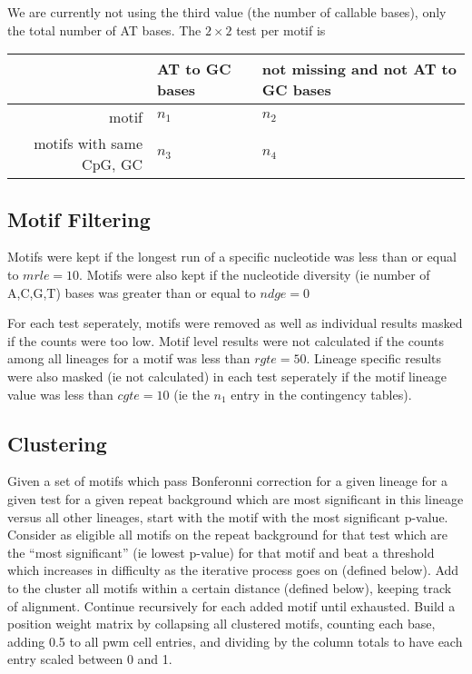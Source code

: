\documentclass{article}\usepackage[]{graphicx}\usepackage[]{color}
\begin{document}
We are currently not using the third value (the number of callable bases), only the total number of AT bases. The $2\times2$ test per motif is
                  
\begin{tabular}{r | l l }
& AT to GC bases & not missing and not AT to GC bases \\\hline
motif & $n_1$ & $n_2$ \\
motifs with same CpG, GC & $n_3$ & $n_4$ \\
\end{tabular}

\subsection*{Motif Filtering}

Motifs were kept if the longest run of a specific nucleotide was less than or equal to $mrle =10$. Motifs were also kept if the nucleotide diversity (ie number of A,C,G,T) bases was greater than or equal to $ndge =0$

For each test seperately, motifs were removed as well as individual results masked if the counts were too low. Motif level results were not calculated if the counts among all lineages for a motif was less than $ rgte = 50$. Lineage specific results were also masked (ie not calculated) in each test seperately if the motif lineage value was less than $cgte = 10$ (ie the $n_1$ entry in the contingency tables).

\subsection*{Clustering}

Given a set of motifs which pass Bonferonni correction for a given lineage for a given test for a given repeat background which are most significant in this lineage versus all other lineages, start with the motif with the most significant p-value. Consider as eligible all motifs on the repeat background for that test which are the ``most significant'' (ie lowest p-value) for that motif and beat a threshold which increases in difficulty as the iterative process goes on (defined below). Add to the cluster all motifs within a certain distance (defined below), keeping track of alignment. Continue recursively for each added motif until exhausted. Build a position weight matrix by collapsing all clustered motifs, counting each base, adding 0.5 to all pwm cell entries, and dividing by the column totals to have each entry scaled between 0 and 1. 
\end{document}
